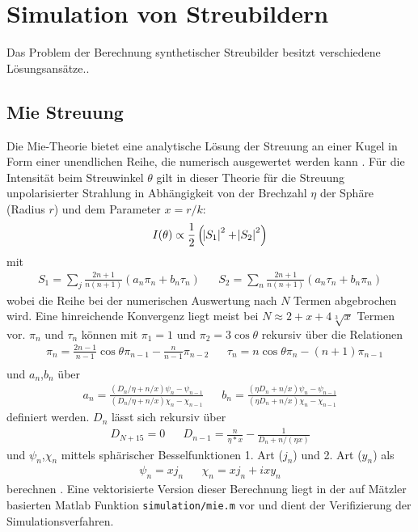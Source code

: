 \chapter{Simulation von Streubildern}
Das Problem der Berechnung synthetischer Streubilder besitzt verschiedene Lösungsansätze..
\section{Mie Streuung}
Die Mie-Theorie bietet eine analytische Lösung der Streuung an einer Kugel  in Form einer unendlichen Reihe, die numerisch ausgewertet werden kann \cite{bohren2008}. Für die Intensität beim Streuwinkel $\theta$ gilt in dieser Theorie für die Streuung unpolarisierter Strahlung in Abhängigkeit von der Brechzahl $\eta$ der Sphäre (Radius $r$) und dem Parameter $x=r/k$:
\begin{equation}
I(\theta)\propto\frac{1}{2}\left(\abs{S_1}^2+\abs{S_2}^2\right)
\end{equation} 
mit
\begin{align}
S_1=\sum_j{\frac{2n+1}{n(n+1)}(a_n\pi_n+b_n\tau_n)} &&S_2=\sum_n{\frac{2n+1}{n(n+1)}(a_n\tau_n+b_n\pi_n)}
\end{align}
wobei die Reihe bei der numerischen Auswertung nach $N$ Termen abgebrochen wird. Eine hinreichende Konvergenz liegt meist bei $N\approx2+x+4\sqrt[3]{x}$ Termen vor.  $\pi_n$ und $\tau_n$ können mit $\pi_1=1$ und  $\pi_2=3\cos{\theta}$ rekursiv über die Relationen
\begin{align}
&\pi_n=\frac{2n-1}{n-1}\cos{\theta}\pi_{n-1}-\frac{n}{n-1}\pi_{n-2}&&\tau_n=n\cos{\theta}\pi_n-(n+1)\pi_{n-1}\\
\end{align}
und $a_n$,$b_n$ über 
\begin{align}
a_n=\frac{(D_n/\eta+n/x)\psi_n-\psi_{n-1}}{(D_n/\eta+n/x)\chi_n-\chi_{n-1}} &&
b_n=\frac{(\eta D_n+n/x)\psi_n-\psi_{n-1}}{(\eta D_n+n/x)\chi_n-\chi_{n-1}}
\end{align} definiert werden. $D_n$ lässt sich rekursiv über
\begin{align}
D_{N+15}=0 && D_{n-1}=\frac{n}{\eta*x}-\frac{1}{D_n+n/(\eta x)}
\end{align}
und $\psi_n$,$\chi_n$ mittels sphärischer Besselfunktionen 1. Art ($j_n$) und 2. Art ($y_n$) als 
\begin{align}
\psi_n=x j_n&&  \chi_n=x j_n+ixy_n
\end{align}
berechnen \cite[S. 112f, 95, 127f]{bohren2008}.
Eine vektorisierte Version dieser Berechnung liegt in der auf Mätzler \cite{maetzler2002} basierten Matlab Funktion \texttt{simulation/mie.m} vor und dient der Verifizierung der Simulationsverfahren.

